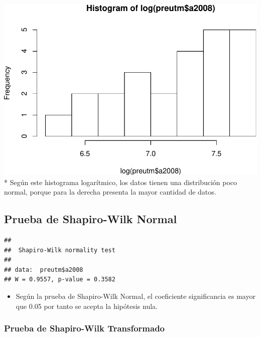 \documentclass[11pt,]{article}
\newenvironment{Shaded}{\begin{snugshade}}{\end{snugshade}}
\newcommand{\KeywordTok}[1]{\textcolor[rgb]{0.13,0.29,0.53}{\textbf{#1}}}
\newcommand{\OperatorTok}[1]{\textcolor[rgb]{0.81,0.36,0.00}{\textbf{#1}}}
\newcommand{\NormalTok}[1]{#1}
\providecommand{\tightlist}{%
\setlength{\itemsep}{0pt}\setlength{\parskip}{0pt}}
\begin{document}
\includegraphics{proyecto_files/figure-latex/unnamed-chunk-26-1.pdf} *
Según este histograma logarítmico, los datos tienen una distribución
poco normal, porque para la derecha presenta la mayor cantidad de datos.

\subsection{Prueba de Shapiro-Wilk
Normal}\label{prueba-de-shapiro-wilk-normal-1}

\begin{Shaded}
\end{Shaded}

\begin{verbatim}
## 
##  Shapiro-Wilk normality test
## 
## data:  preutm$a2008
## W = 0.9557, p-value = 0.3582
\end{verbatim}

\begin{itemize}
\tightlist
\item
  Según la prueba de Shapiro-Wilk Normal, el coeficiente significancia
  es mayor que 0.05 por tanto se acepta la hipótesis nula.
\end{itemize}

\subsubsection{Prueba de Shapiro-Wilk
Transformado}\label{prueba-de-shapiro-wilk-transformado-1}
\end{document}
